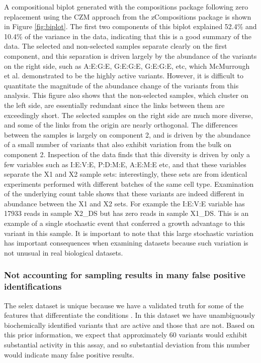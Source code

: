 \documentclass[article]{ajs}\usepackage[]{graphicx}\usepackage[]{color}
\begin{document}
A compositional biplot generated with the compositions  package \citep{vandenBoogaart2008320} following zero replacement using the CZM approach from the zCompositions  package \citep{PalareaAlbaladejo201585} is shown in Figure \ref{fig:biplot}. The first two components of this biplot explained 52.4\% and 10.4\% of the variance in the data, indicating that this is a good summary of the data. The selected and non-selected samples separate clearly on the first component, and this separation is driven largely by the abundance of the variants on the right side, such as A:E:G:E, G:E:G:E, G:E:G:E, etc,  which McMurrough et al. \citeyear{mcmurrough:2014} demonstrated to be the highly active variants. However, it is difficult to quantitate the magnitude of the abundance change of the variants from this analysis. This figure also shows that the  non-selected samples, which cluster on the left side, are essentially redundant since the links between them are exceedingly short. The selected samples on the right side are much more diverse, and some of the links from the origin are nearly orthogonal. The differences between the samples is largely on component 2, and is driven by the abundance of a small number of variants that also exhibit variation from the bulk on component 2. Inspection of the data finds that this diversity is driven by only a few variables such as I:E:V:E, P:D:M:E, A:E:M:E etc, and that these variables separate the X1 and X2 sample sets: interestingly, these sets are from identical experiments performed with different batches of the same cell type. Examination of the underlying count table shows that these variants are indeed  different in abundance between the X1 and X2 sets. For example the I:E:V:E variable has 17933 reads in sample X2\_DS but has zero reads in sample X1\_DS. This is an example of a single stochastic event that conferred a growth advantage to this variant in this sample. It is important to note that this large stochastic variation has important consequences when examining  datasets because such variation is not unusual in real biological datasets.


\subsubsection{Not accounting for sampling results in many false positive identifications}
\vskip-0.25cm

The selex dataset is unique because we have a validated truth for some of the features that differentiate the conditions \citep{mcmurrough:2014}. In this dataset we have unambiguously biochemically identified variants that are active and those that are not. Based on this prior information, we expect that approximately 60 variants would exhibit substantial activity in this assay, and so substantial deviation from this number would indicate many false positive results.
\end{document}
